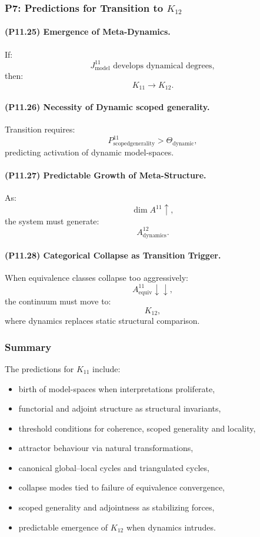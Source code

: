\subsubsection{P7: Predictions for Transition to $K_{12}$}

\paragraph{(P11.25) Emergence of Meta-Dynamics.}
If:
\[
J_{\mathrm{model}}^{11}
\text{ develops dynamical degrees},
\]
then:
\[
K_{11} \to K_{12}.
\]

\paragraph{(P11.26) Necessity of Dynamic scoped generality.}
Transition requires:
\[
P_{\mathrm{scoped generality}}^{11} 
> \Theta_{\mathrm{dynamic}},
\]
predicting activation of dynamic model-spaces.

\paragraph{(P11.27) Predictable Growth of Meta-Structure.}
As:
\[
\dim A^{11} \uparrow,
\]
the system must generate:
\[
A_{\mathrm{dynamics}}^{12}.
\]

\paragraph{(P11.28) Categorical Collapse as Transition Trigger.}
When equivalence classes collapse too aggressively:
\[
A_{\mathrm{equiv}}^{11} \downarrow \downarrow,
\]
the continuum must move to:
\[
K_{12},
\]
where dynamics replaces static structural comparison.

\subsubsection{Summary}

The predictions for $K_{11}$ include:
\begin{itemize}
    \item birth of model-spaces when interpretations proliferate,
    \item functorial and adjoint structure as structural invariants,
    \item threshold conditions for coherence, scoped generality and locality,
    \item attractor behaviour via natural transformations,
    \item canonical global–local cycles and triangulated cycles,
    \item collapse modes tied to failure of equivalence convergence,
    \item scoped generality and adjointness as stabilizing forces,
    \item predictable emergence of $K_{12}$ when dynamics intrudes.
\end{itemize}
